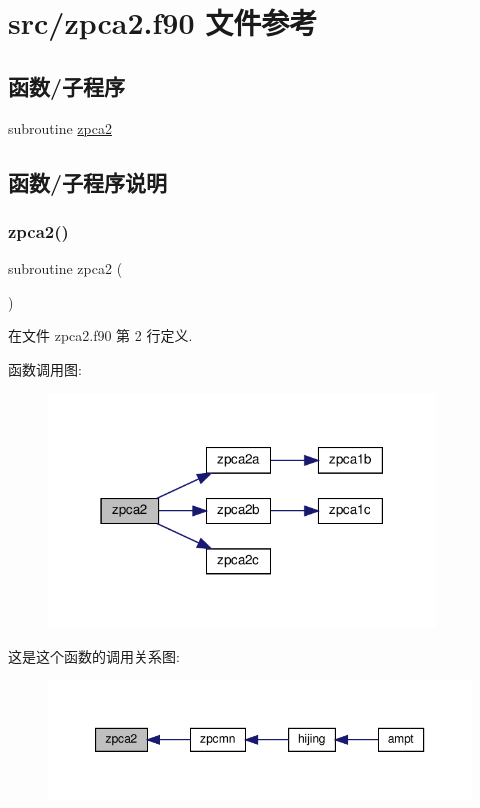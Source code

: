 \hypertarget{zpca2_8f90}{}\section{src/zpca2.f90 文件参考}
\label{zpca2_8f90}
\subsection*{函数/子程序}
\begin{DoxyCompactItemize}
\item 
subroutine \mbox{\hyperlink{zpca2_8f90_af76c51090161b44e8a228b1e15461200}{zpca2}}
\end{DoxyCompactItemize}


\subsection{函数/子程序说明}
\mbox{\label{zpca2_8f90_af76c51090161b44e8a228b1e15461200}} 
\subsubsection{\texorpdfstring{zpca2()}{zpca2()}}
{\footnotesize\ttfamily subroutine zpca2 (\begin{DoxyParamCaption}{ }\end{DoxyParamCaption})}



在文件 zpca2.\+f90 第 2 行定义.

函数调用图\+:
\nopagebreak
\begin{figure}[H]
\begin{center}
\leavevmode
\includegraphics[width=291pt]{zpca2_8f90_af76c51090161b44e8a228b1e15461200_cgraph}
\end{center}
\end{figure}
这是这个函数的调用关系图\+:
\nopagebreak
\begin{figure}[H]
\begin{center}
\leavevmode
\includegraphics[width=350pt]{zpca2_8f90_af76c51090161b44e8a228b1e15461200_icgraph}
\end{center}
\end{figure}
